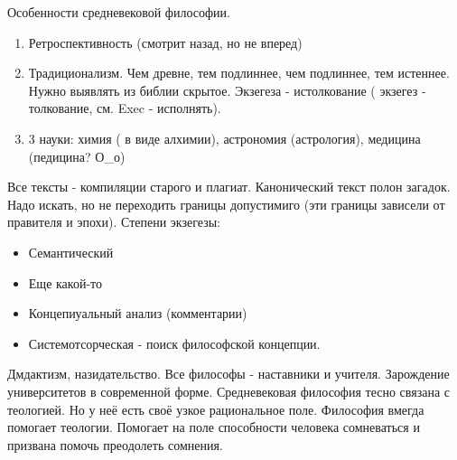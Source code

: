Особенности средневековой философии.
\begin{enumerate}
	\item Ретроспективность (смотрит назад, но не вперед)
	\item Традиционализм. Чем древне, тем подлиннее, чем подлиннее, тем истеннее. Нужно выявлять из библии скрытое. Экзегеза - истолкование ( экзегез - толкование, см. Exec - исполнять).
	\item 3 науки: химия ( в виде алхимии), астрономия (астрология), медицина (педицина? О\_о)
\end{enumerate}
Все тексты - компиляции старого и плагиат.
Канонический текст полон загадок. Надо искать, но не переходить границы допустимиго (эти границы зависели от правителя и эпохи).
Степени экзегезы:

\begin{itemize}
	\item Семантический
	\item Еще какой-то
	\item Концепиуальный анализ (комментарии)
	\item Системотсорческая - поиск философской концепции.
\end{itemize}
Дмдактизм, назидательство. Все философы - наставники и учителя. Зарождение университетов в современной форме.
Средневековая философия тесно связана с теологией. Но у неё есть своё узкое рациональное поле. Философия вмегда помогает теологии. Помогает на поле способности человека сомневаться и призвана помочь преодолеть сомнения.
